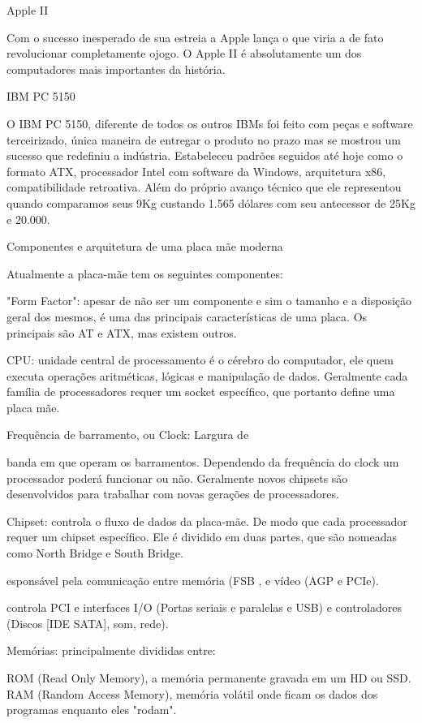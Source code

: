 \documentclass[a4paper,10pt]{article}
\begin{document}
Apple II

Com o sucesso inesperado de sua estreia a Apple lança o que viria a de fato revolucionar completamente ojogo. O Apple II é absolutamente um dos computadores mais importantes da história.

IBM PC 5150

O IBM PC 5150, diferente de todos os outros IBMs foi feito com peças e software terceirizado, única maneira de entregar o produto no prazo mas se mostrou um sucesso que redefiniu a indústria. Estabeleceu padrões seguidos até hoje como o formato ATX, processador Intel com software da Windows, arquitetura x86, compatibilidade retroativa. Além do próprio avanço técnico que ele representou quando comparamos seus 9Kg custando 1.565 dólares com seu antecessor de 25Kg e 20.000.

Componentes e arquitetura de uma placa mãe moderna

Atualmente a placa-mãe tem os seguintes componentes:

"Form Factor": apesar de não ser um componente e sim o tamanho e a disposição geral dos mesmos, é uma das principais características de uma placa. Os principais são AT e ATX, mas existem outros.

CPU: unidade central de processamento é o cérebro do computador, ele quem executa operações aritméticas, lógicas e manipulação de dados. Geralmente cada família de processadores requer um socket específico, que portanto define uma placa mãe.

Frequência de barramento, ou Clock: Largura de

banda em que operam os barramentos. Dependendo da frequência do clock um processador poderá funcionar ou não. Geralmente novos chipsets são desenvolvidos para trabalhar com novas gerações de processadores.

Chipset: controla o fluxo de dados da placa-mãe. De modo que cada processador requer um chipset específico. Ele é dividido em duas partes, que são nomeadas como North Bridge e South Bridge.

esponsável pela comunicação entre memória (FSB , e vídeo (AGP e PCIe).

controla PCI e interfaces I/O (Portas seriais e paralelas e USB) e controladores (Discos [IDE SATA], som, rede).

Memórias: principalmente divididas entre:

ROM (Read Only Memory), a memória permanente gravada em um HD ou SSD. RAM (Random Access Memory), memória volátil onde ficam os dados dos programas enquanto eles "rodam".
\end{document}
